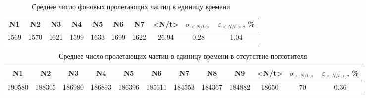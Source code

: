 \begin{landscape}

\begin{table}[]
\centering
\caption{Среднее число фоновых пролетающих частиц в единицу времени}
\label{t5}
\begin{tabular}{|c|c|c|c|c|c|c|c|c|c|}
\hline
\rowcolor[HTML]{C6E0B4} 
N1   & N2   & N3   & N4   & N5   & N6   & N7   & <N/t> & $\sigma_{<N/t>}$ & $\varepsilon_{<N/t>}$,   \% \\ \hline
1569 & 1570 & 1621 & 1599 & 1633 & 1699 & 1622 & 26.94 & 0.28             & 1.04                        \\ \hline
\end{tabular}
\end{table}

\begin{table}[]
\centering
\caption{Среднее число пролетающих частиц в единицу времени в отсутствие поглотителя}
\label{t4}
\begin{tabular}{|c|c|c|c|c|c|c|c|c|c|c|c|}
\hline
\rowcolor[HTML]{C6E0B4} 
N1     & N2     & N3     & N4     & N5     & N6     & N7     & N8     & N9     & <N/t> & $\sigma_{<N/t>}$ & $\varepsilon_{<N/t>}$,  \% \\ \hline
190580 & 188305 & 186980 & 186893 & 186396 & 185611 & 184553 & 184367 & 184882 & 18650 & 70               & 0.36                       \\ \hline
\end{tabular}
\end{table}


\end{landscape}
